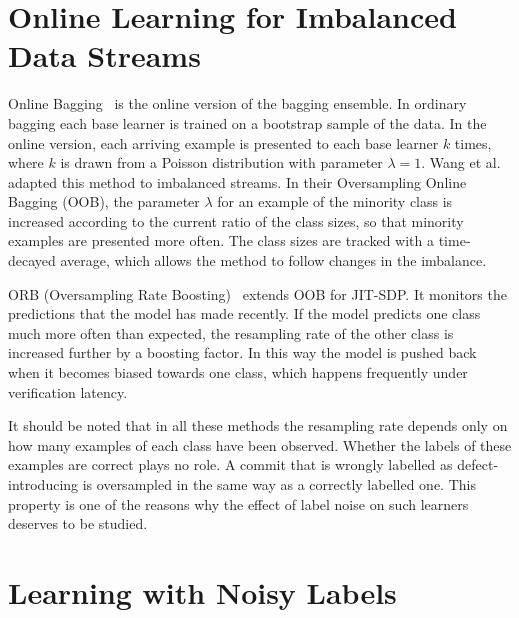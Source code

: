 \documentclass[12pt,a4paper,oneside]{report}
\begin{document}
\section{Online Learning for Imbalanced Data Streams}\label{sec:lit-online}

Online Bagging~\cite{oza2001onlinebagging} is the online version of the
bagging ensemble. In ordinary bagging each base learner is trained on a
bootstrap sample of the data. In the online version, each arriving example is
presented to each base learner $k$ times, where $k$ is drawn from a Poisson
distribution with parameter $\lambda = 1$. Wang et al.~\cite{wang2015oob}
adapted this method to imbalanced streams. In their Oversampling Online
Bagging (OOB), the parameter $\lambda$ for an example of the minority class
is increased according to the current ratio of the class sizes, so that
minority examples are presented more often. The class sizes are tracked with
a time-decayed average, which allows the method to follow changes in the
imbalance.

ORB (Oversampling Rate Boosting)~\cite{cabral2019orb} extends OOB for
JIT-SDP. It monitors the predictions that the model has made recently. If the
model predicts one class much more often than expected, the resampling rate
of the other class is increased further by a boosting factor. In this way the
model is pushed back when it becomes biased towards one class, which happens
frequently under verification latency.

It should be noted that in all these methods the resampling rate depends only
on how many examples of each class have been observed. Whether the labels of
these examples are correct plays no role. A commit that is wrongly labelled
as defect-introducing is oversampled in the same way as a correctly labelled
one. This property is one of the reasons why the effect of label noise on
such learners deserves to be studied.

\section{Learning with Noisy Labels}
\end{document}
